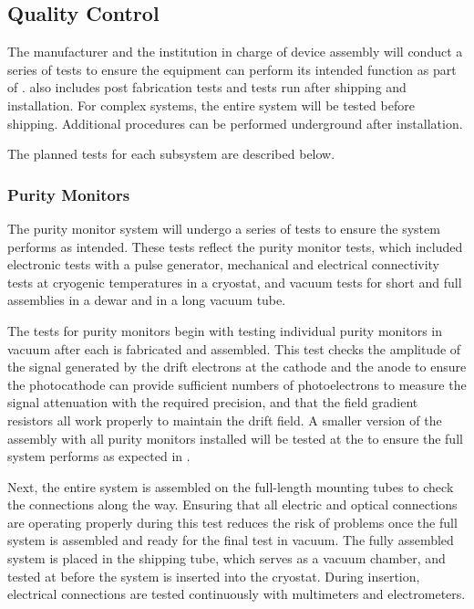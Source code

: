 \subsection{ Quality Control}

The manufacturer and the institution in charge of device assembly will
conduct a series of tests to ensure the equipment can perform its
intended function as part of .  also includes post fabrication
tests and tests run after shipping and installation. For complex
systems, the entire system will be tested before shipping. Additional
 procedures can be performed underground after installation.

The planned tests for each subsystem are described below.

\subsubsection{Purity Monitors}

The purity monitor system will undergo a series of tests to ensure the
system performs as intended.  These tests reflect the 
purity monitor  tests, which included electronic tests with a pulse
generator, mechanical and electrical connectivity tests at cryogenic
temperatures in a cryostat, and vacuum tests for short and full
assemblies in a dewar and in a long vacuum tube.

The  tests for  purity monitors begin with testing
individual purity monitors in vacuum after each is fabricated and
assembled. This test checks the amplitude of the signal generated by
the drift electrons at the cathode and the anode to ensure the
photocathode can provide sufficient numbers of photoelectrons to
measure the signal attenuation with the required precision, and that
the field gradient resistors all work properly to maintain the drift
field. A smaller version of the assembly with all purity monitors
installed will be tested at the  to ensure the full system
performs as expected in .

Next, the entire system is assembled on the full-length mounting tubes
to check the connections along the way. Ensuring that all electric and
optical connections are operating properly during this test reduces
the risk of problems once the full system is assembled and ready for
the final test in vacuum. The fully assembled system is placed in the
shipping tube, which serves as a vacuum chamber, and tested at
 before the system is inserted into the cryostat. During
insertion, electrical connections are tested continuously with
multimeters and electrometers.

